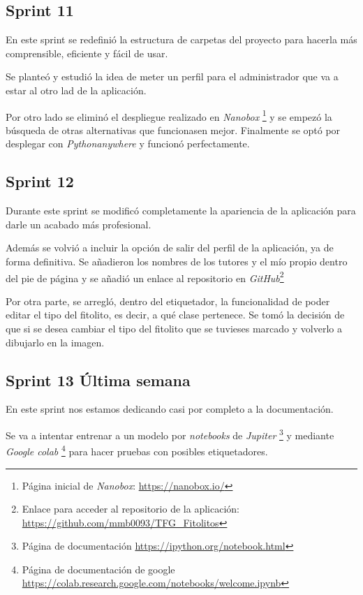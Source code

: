 \subsection{Sprint 11}

En este sprint se redefinió la estructura de carpetas del proyecto para hacerla más comprensible, eficiente y fácil de usar.

Se planteó y estudió la idea de meter un perfil para el administrador que va a estar al otro lad de la aplicación.

Por otro lado se eliminó el despliegue realizado en \textit{Nanobox} \footnote{Página inicial de \textit{Nanobox}: \url{https://nanobox.io/} } y se empezó la búsqueda de otras alternativas que funcionasen mejor.
Finalmente se optó por desplegar con \textit{Pythonanywhere} y funcionó perfectamente.


\subsection{Sprint 12}

Durante este sprint se modificó completamente la apariencia de la aplicación para darle un acabado más profesional.

Además se volvió a incluir la opción de salir del perfil de la aplicación, ya de forma definitiva.
Se añadieron los nombres de los tutores y el mío propio dentro del pie de página y se añadió un enlace al repositorio en \textit{GitHub}\footnote{Enlace para acceder al repositorio de la aplicación: \url{https://github.com/mmb0093/TFG_Fitolitos}}

Por otra parte, se arregló, dentro del etiquetador, la funcionalidad de poder editar el tipo del fitolito, es decir, a qué clase pertenece. Se tomó la decisión de que si se desea cambiar el tipo del fitolito que se tuvieses marcado y  volverlo a dibujarlo en la imagen.

\subsection{Sprint 13 Última semana}

En este sprint nos estamos dedicando casi por completo a la documentación.

Se va a intentar entrenar a un modelo por \textit{notebooks} de \textit{Jupiter} \footnote{Página de documentación \url{https://ipython.org/notebook.html}} y mediante \textit{Google colab} \footnote{Página de documentación de google \url{https://colab.research.google.com/notebooks/welcome.ipynb}} para hacer pruebas con posibles etiquetadores.

